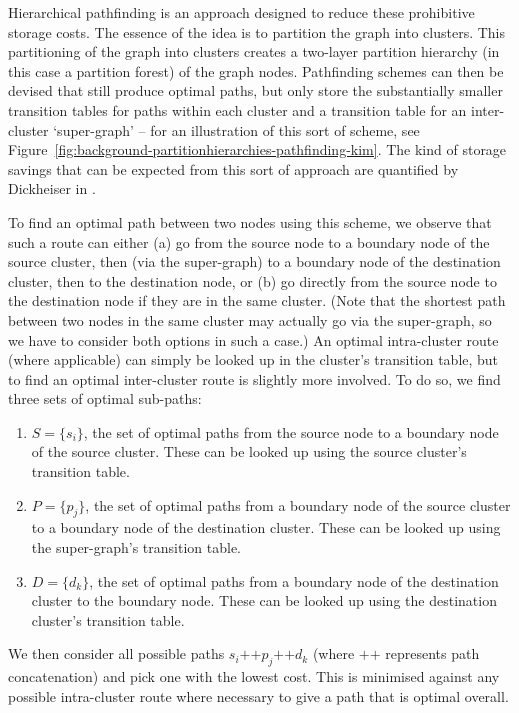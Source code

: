 Hierarchical pathfinding is an approach designed to reduce these prohibitive storage costs. The essence of the idea is to partition the graph into clusters. This partitioning of the graph into clusters creates a two-layer partition hierarchy (in this case a partition forest) of the graph nodes. Pathfinding schemes can then be devised that still produce optimal paths, but only store the substantially smaller transition tables for paths within each cluster and a transition table for an inter-cluster `super-graph' -- for an illustration of this sort of scheme, see Figure~\ref{fig:background-partitionhierarchies-pathfinding-kim}. The kind of storage savings that can be expected from this sort of approach are quantified by Dickheiser in \cite{dickheiser04}.


To find an optimal path between two nodes using this scheme, we observe that such a route can either (a) go from the source node to a boundary node of the source cluster, then (via the super-graph) to a boundary node of the destination cluster, then to the destination node, or (b) go directly from the source node to the destination node if they are in the same cluster. (Note that the shortest path between two nodes in the same cluster may actually go via the super-graph, so we have to consider both options in such a case.) An optimal intra-cluster route (where applicable) can simply be looked up in the cluster's transition table, but to find an optimal inter-cluster route is slightly more involved. To do so, we find three sets of optimal sub-paths:
%
\begin{enumerate}

\item $S = \{s_i\}$, the set of optimal paths from the source node to a boundary node of the source cluster. These can be looked up using the source cluster's transition table.
\item $P = \{p_j\}$, the set of optimal paths from a boundary node of the source cluster to a boundary node of the destination cluster. These can be looked up using the super-graph's transition table.
\item $D = \{d_k\}$, the set of optimal paths from a boundary node of the destination cluster to the boundary node. These can be looked up using the destination cluster's transition table.

\end{enumerate}
%
We then consider all possible paths $s_i \mbox{++} p_j \mbox{++} d_k$ (where $\mbox{++}$ represents path concatenation) and pick one with the lowest cost. This is minimised against any possible intra-cluster route where necessary to give a path that is optimal overall.

